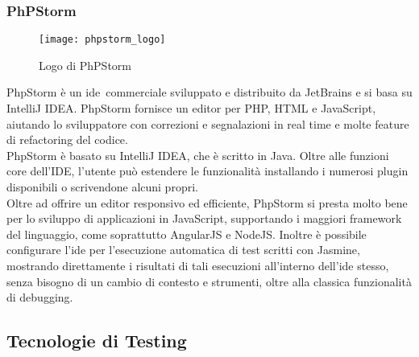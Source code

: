 \subsubsection{PhPStorm}
\begin{figure}[hb] 
    \centering 
    \texttt{[image: phpstorm\_logo]} 
    \caption{Logo di PhPStorm}
\end{figure}
PhpStorm è un \gls{ide}\glsfirstoccur\  commerciale sviluppato e distribuito da JetBrains e si basa su IntelliJ IDEA.
PhpStorm fornisce un editor per PHP, HTML e JavaScript, aiutando lo sviluppatore con correzioni e segnalazioni in real time e molte feature di refactoring del codice.\\
PhpStorm è basato su IntelliJ IDEA, che è scritto in Java. Oltre alle funzioni core dell’IDE, l’utente può estendere le funzionalità installando i numerosi plugin disponibili o scrivendone alcuni propri.\\
Oltre ad offrire un editor responsivo ed efficiente, PhpStorm si presta molto bene per lo sviluppo di applicazioni in JavaScript, supportando i maggiori framework del linguaggio, come soprattutto AngularJS e NodeJS. 
Inoltre è possibile configurare l’\gls{ide} per l’esecuzione automatica di test scritti con Jasmine, mostrando direttamente i risultati di tali esecuzioni all’interno dell’\gls{ide} stesso, senza bisogno di un cambio di contesto e strumenti, oltre alla classica funzionalità di debugging.

\subsection{Tecnologie di Testing}
